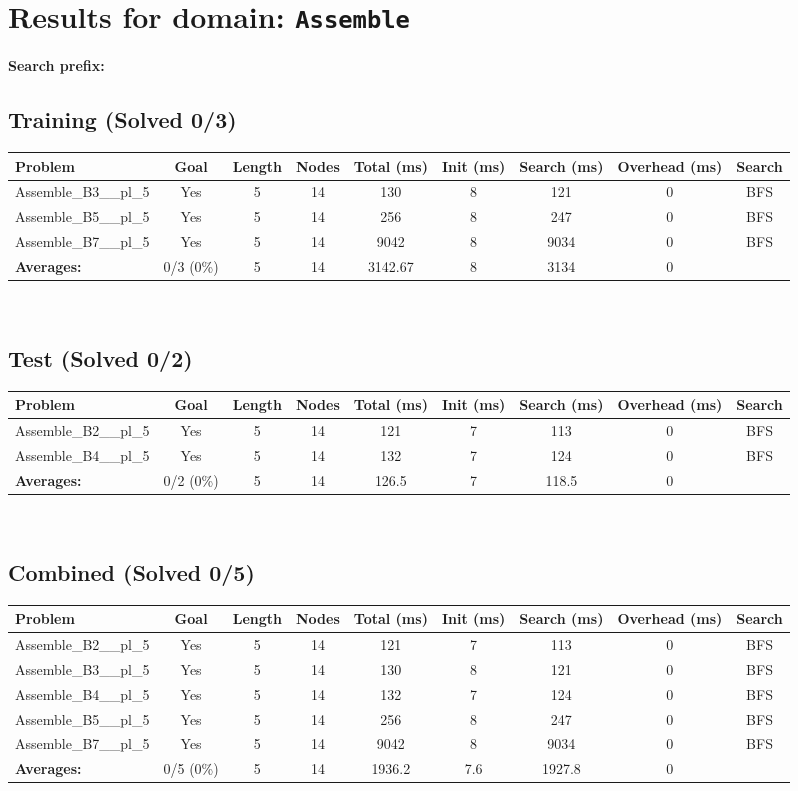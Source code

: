 \documentclass{article}
\begin{document}
\section*{Results for domain: \texttt{Assemble}}
\textbf{Search prefix:} 
\\[0.5cm]
\subsection*{Training (Solved 0/3)}
\begin{tabular}{lcccccccc}
\toprule
Problem & Goal & Length & Nodes & Total (ms) & Init (ms) & Search (ms) & Overhead (ms) & Search \\
\midrule
Assemble\_B3\_\_pl\_5 & Yes & 5 & 14 & 130 & 8 & 121 & 0 & BFS \\
Assemble\_B5\_\_pl\_5 & Yes & 5 & 14 & 256 & 8 & 247 & 0 & BFS \\
Assemble\_B7\_\_pl\_5 & Yes & 5 & 14 & 9042 & 8 & 9034 & 0 & BFS \\
\textbf{Averages:} & 0/3 (0\%) & 5 & 14 & 3142.67 & 8 & 3134 & 0 & \\
\bottomrule
\end{tabular}
\\[0.7cm]
\subsection*{Test (Solved 0/2)}
\begin{tabular}{lcccccccc}
\toprule
Problem & Goal & Length & Nodes & Total (ms) & Init (ms) & Search (ms) & Overhead (ms) & Search \\
\midrule
Assemble\_B2\_\_pl\_5 & Yes & 5 & 14 & 121 & 7 & 113 & 0 & BFS \\
Assemble\_B4\_\_pl\_5 & Yes & 5 & 14 & 132 & 7 & 124 & 0 & BFS \\
\textbf{Averages:} & 0/2 (0\%) & 5 & 14 & 126.5 & 7 & 118.5 & 0 & \\
\bottomrule
\end{tabular}
\\[0.7cm]
\subsection*{Combined (Solved 0/5)}
\begin{tabular}{lcccccccc}
\toprule
Problem & Goal & Length & Nodes & Total (ms) & Init (ms) & Search (ms) & Overhead (ms) & Search \\
\midrule
Assemble\_B2\_\_pl\_5 & Yes & 5 & 14 & 121 & 7 & 113 & 0 & BFS \\
Assemble\_B3\_\_pl\_5 & Yes & 5 & 14 & 130 & 8 & 121 & 0 & BFS \\
Assemble\_B4\_\_pl\_5 & Yes & 5 & 14 & 132 & 7 & 124 & 0 & BFS \\
Assemble\_B5\_\_pl\_5 & Yes & 5 & 14 & 256 & 8 & 247 & 0 & BFS \\
Assemble\_B7\_\_pl\_5 & Yes & 5 & 14 & 9042 & 8 & 9034 & 0 & BFS \\
\textbf{Averages:} & 0/5 (0\%) & 5 & 14 & 1936.2 & 7.6 & 1927.8 & 0 & \\
\bottomrule
\end{tabular}
\\[0.7cm]
\end{document}
